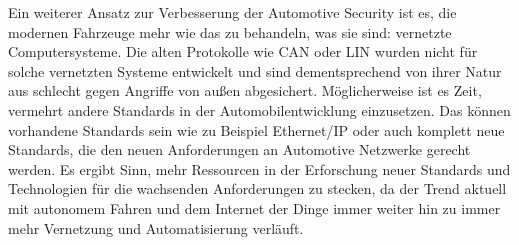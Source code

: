 Ein weiterer Ansatz zur Verbesserung der Automotive Security ist es, die modernen Fahrzeuge mehr wie das zu behandeln, was sie sind: vernetzte Computersysteme. Die alten Protokolle wie \acs{CAN} oder \acs{LIN} wurden nicht für solche vernetzten Systeme entwickelt und sind dementsprechend von ihrer Natur aus schlecht gegen Angriffe von außen abgesichert. Möglicherweise ist es Zeit, vermehrt andere Standards in der Automobilentwicklung einzusetzen. Das können vorhandene Standards sein wie zu Beispiel Ethernet/IP oder auch komplett neue Standards, die den neuen Anforderungen an Automotive Netzwerke gerecht werden. Es ergibt Sinn, mehr Ressourcen in der Erforschung neuer Standards und Technologien für die wachsenden Anforderungen zu stecken, da der Trend aktuell mit autonomem Fahren und dem Internet der Dinge immer weiter hin zu immer mehr Vernetzung und Automatisierung verläuft.















